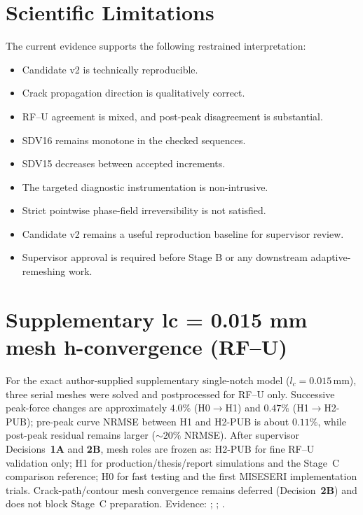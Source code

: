 \section{Scientific Limitations}

The current evidence supports the following restrained interpretation:

\begin{itemize}
\item Candidate v2 is technically reproducible.
\item Crack propagation direction is qualitatively correct.
\item RF--U agreement is mixed, and post-peak disagreement is substantial.
\item SDV16 remains monotone in the checked sequences.
\item SDV15 decreases between accepted increments.
\item The targeted diagnostic instrumentation is non-intrusive.
\item Strict pointwise phase-field irreversibility is not satisfied.
\item Candidate v2 remains a useful reproduction baseline for supervisor
review.
\item Supervisor approval is required before Stage B or any downstream
adaptive-remeshing work.
\end{itemize}


\section{Supplementary lc = 0.015 mm mesh h-convergence (RF--U)}
\label{sec:lc015-hconv-thesis}

For the exact author-supplied supplementary single-notch model (\(l_c=0.015\,\mathrm{mm}\)), three serial meshes were solved and postprocessed for RF--U only.
Successive peak-force changes are approximately \(4.0\%\) (H0\(\to\)H1) and \(0.47\%\) (H1\(\to\)H2-PUB); pre-peak curve NRMSE between H1 and H2-PUB is about \(0.11\%\), while post-peak residual remains larger (\(\sim 20\%\) NRMSE).
After supervisor Decisions~\textbf{1A} and \textbf{2B}, mesh roles are frozen as:
H2-PUB for fine RF--U validation only; H1 for production/thesis/report simulations and the Stage~C comparison reference; H0 for fast testing and the first MISESERI implementation trials.
Crack-path/contour mesh convergence remains deferred (Decision~\textbf{2B}) and does not block Stage~C preparation.
Evidence: ;
;
.

